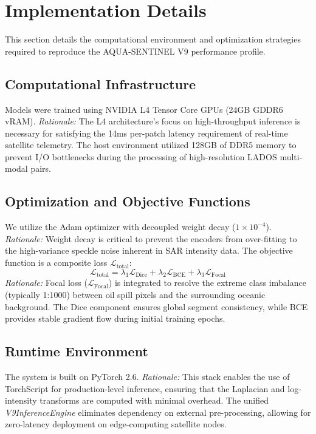 \section{Implementation Details}
This section details the computational environment and optimization strategies required to reproduce the AQUA-SENTINEL V9 performance profile.

\subsection{Computational Infrastructure}
Models were trained using NVIDIA L4 Tensor Core GPUs (24GB GDDR6 vRAM). \textit{Rationale:} The L4 architecture's focus on high-throughput inference is necessary for satisfying the 14ms per-patch latency requirement of real-time satellite telemetry. The host environment utilized 128GB of DDR5 memory to prevent I/O bottlenecks during the processing of high-resolution LADOS multi-modal pairs.

\subsection{Optimization and Objective Functions}
We utilize the Adam optimizer with decoupled weight decay ($1 \times 10^{-4}$). \textit{Rationale:} Weight decay is critical to prevent the encoders from over-fitting to the high-variance speckle noise inherent in SAR intensity data. The objective function is a composite loss $\mathcal{L}_{\text{total}}$:
\begin{equation}
\mathcal{L}_{\text{total}} = \lambda_1 \mathcal{L}_{\text{Dice}} + \lambda_2 \mathcal{L}_{\text{BCE}} + \lambda_3 \mathcal{L}_{\text{Focal}}
\end{equation}
\textit{Rationale:} Focal loss ($\mathcal{L}_{\text{Focal}}$) is integrated to resolve the extreme class imbalance (typically 1:1000) between oil spill pixels and the surrounding oceanic background. The Dice component ensures global segment consistency, while BCE provides stable gradient flow during initial training epochs.

\subsection{Runtime Environment}
The system is built on PyTorch 2.6. \textit{Rationale:} This stack enables the use of TorchScript for production-level inference, ensuring that the Laplacian and log-intensity transforms are computed with minimal overhead. The unified \textit{V9InferenceEngine} eliminates dependency on external pre-processing, allowing for zero-latency deployment on edge-computing satellite nodes.
